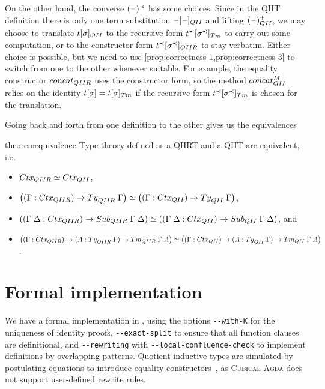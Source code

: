 \documentclass[a4paper,UKenglish,numberwithinsect,cleveref,thm-restate]{lipics-v2021}
\begin{document}
On the other hand, the converse $(\mathord{\hspace{1pt}\text{--}\hspace{1pt}})^{\prec}$ has some choices.
Since in the QIIT definition there is only one term substitution $\blank [\blank]_{\I}$ and lifting $(\blank)^+_{\I}$, we may choose to translate $t [\sigma]_{\I}$ to the recursive form $t^{\prec} [\sigma^{\prec}]_{\Tm}$ to carry out some computation, or to the constructor form $t^{\prec} [\sigma^{\prec}]_{\IR}$ to stay verbatim.
Either choice is possible, but we need to use \cref{prop:correctness-1,prop:correctness-3} to switch from one to the other whenever suitable.
For example, the equality constructor $\mathsf{concat}_{\IR}$ uses the constructor form, so the method $\mathsf{concat}^M_{\I}$ relies on the identity $\sub{t}{\sigma} = \subTm{t}{\sigma}$ if the recursive form $\subTm{t^{\prec}}{\sigma^{\prec}}$ is chosen for the translation.

Going back and forth from one definition to the other gives us the equivalences
\begin{restatable}{theorem}{equivalence}
  Type theory defined as a QIIRT and a QIIT are equivalent, i.e.\ 
  \begin{itemize}
    \item $\eqv{\Ctx_{\IR}}{\Ctx_{\I}}$, 
    \item $\eqv{\left((\Gamma : \Ctx_{\IR})\to\Ty_{\IR}\;\Gamma\right)}{\left((\Gamma : \Ctx_{\I})\to\Ty_{\I}\;\Gamma\right)}$,
    \item $\eqv{\left((\Gamma\;\Delta : \Ctx_{\IR}) \to \Sub_{\IR}\;\Gamma\;\Delta\right)}%
               {\left((\Gamma\;\Delta: \Ctx_{\I}) \to \Sub_{\I}\;\Gamma\;\Delta\right)}$, and 
    \item $\eqv{\left((\Gamma : \Ctx_{\IR}) \to (A : \Ty_{\IR}\;\Gamma) \to \Tm_{\IR}\;\Gamma\;A\right)}
               {\left((\Gamma : \Ctx_{\I}) \to (A : \Ty_{\I}\;\Gamma) \to \Tm_{\I}\;\Gamma\;A\right)}$.
  \end{itemize}
\end{restatable}

\section{Formal implementation} \label{sec:formal-implementation}

We have a formal implementation in \Agda, using the options \texttt{-{}-with-K} for the uniqueness of identity proofs, \texttt{-{}-exact-split} to ensure that all function clauses are definitional, and \texttt{-{}-rewriting} with \texttt{-{}-local-confluence-check} \cite{Cockx2020,Cockx2021} to implement definitions by overlapping patterns.
Quotient inductive types are simulated by postulating equations to introduce equality constructors~\cite{Licata2011}, as \textsc{Cubical Agda} does not support user-defined rewrite rules.
\end{document}
